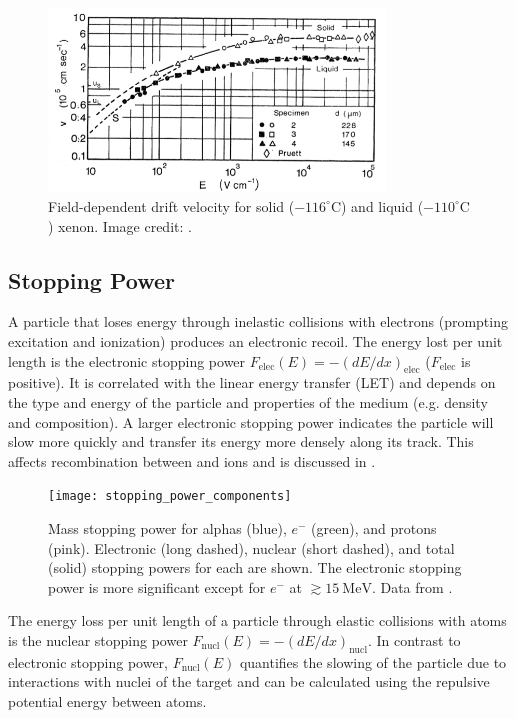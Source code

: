 \begin{figure}
\includegraphics[angle=0.5, width=0.8\textwidth]{DriftVelocity}
\caption{Field-dependent drift velocity for solid ($-116^{\circ}\mathrm{C}$) and liquid ($-110^{\circ}\mathrm{C}$) xenon.  Image credit:
.}
\label{fig:drift_velocity}
\end{figure}




\subsection{Stopping Power}
\label{subsec:stopping_power}
A particle that loses energy through inelastic collisions with electrons (prompting excitation and ionization) produces an electronic
recoil.  The energy lost per unit
length is the electronic stopping power $F_{\mathrm{elec}}(E) = -(dE/dx)_{\mathrm{elec}}$ ($F_{\mathrm{elec}}$ is positive).  It is
correlated with the linear energy transfer (LET) and depends on the type and energy of the particle and properties of the
medium (e.g. density and composition).  A larger electronic stopping power indicates the particle will slow more quickly and
transfer its energy more densely along its track.  This affects recombination between \electron and ions and is discussed in
.

\begin{figure}[t]
\texttt{[image: stopping\_power\_components]}
\caption{Mass stopping power for alphas (blue), $e^{-}$ (green), and protons (pink).  Electronic (long dashed), nuclear (short dashed),
and total (solid) stopping powers for each are shown.  The electronic stopping power is more significant except for $e^-$ at
$\gtrsim 15\ \mathrm{MeV}$.  Data from .}
\label{fig:mass_stopping_power}
\end{figure}

The energy loss per unit length of a particle through elastic collisions with atoms is the nuclear stopping power
$F_{\mathrm{nucl}}(E) = -(dE/dx)_{\mathrm{nucl}}$.  In contrast to electronic stopping power,
$F_{\mathrm{nucl}}(E)$ quantifies the slowing of the particle due to interactions with nuclei of the target and can be calculated using
the repulsive potential energy between atoms.

